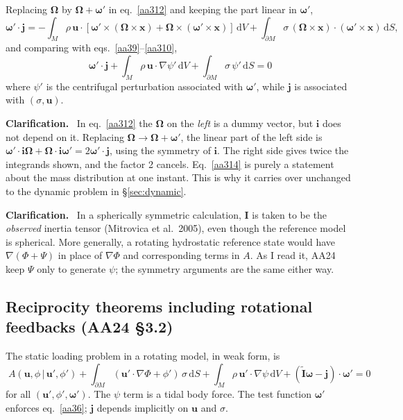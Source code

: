 \documentclass[11pt,a4paper]{article}
\newcommand{\bO}{\bm{\Omega}}
\newcommand{\bw}{\bm{\omega}}
\newcommand{\bx}{\mathbf{x}}
\newcommand{\bu}{\mathbf{u}}
\newcommand{\bj}{\mathbf{j}}
\newcommand{\bI}{\mathbf{I}}
\newcommand{\bi}{\mathbf{i}}
\newcommand{\It}{\tilde{\mathbf{I}}}
\newcommand{\dd}{\,\mathrm{d}}
\newcommand{\pM}{\partial M}
\renewenvironment{leftbar}{%
  \def\FrameCommand{{\color{clarbar}\vrule width 2.5pt}\hspace{8pt}}%
  \MakeFramed{\advance\hsize-\width\FrameRestore}}%
  {\endMakeFramed}
\newenvironment{clar}{\begin{leftbar}\small\noindent\textbf{Clarification.}\ }{\end{leftbar}}
\begin{document}
Replacing $\bO$ by $\bO+\bw'$ in eq.~\eqref{aa312} and keeping the part linear in $\bw'$,
\begin{equation}
  \bw'\cdot\bj=-\int_M\rho\,\bu\cdot[\bw'\times(\bO\times\bx)+\bO\times(\bw'\times\bx)]\dd V
  +\int_{\pM}\sigma\,(\bO\times\bx)\cdot(\bw'\times\bx)\dd S,
  \tag{3.13}\label{aa313}
\end{equation}
and comparing with eqs.~\eqref{aa39}--\eqref{aa310},
\begin{equation}
  \boxed{\;\bw'\cdot\bj+\int_M\rho\,\bu\cdot\nabla\psi'\dd V+\int_{\pM}\sigma\,\psi'\dd S=0\;}
  \tag{3.14}\label{aa314}
\end{equation}
where $\psi'$ is the centrifugal perturbation associated with $\bw'$, while $\bj$ is associated
with $(\sigma,\bu)$.

\begin{clar}
In eq.~\eqref{aa312} the $\bO$ on the \emph{left} is a dummy vector, but $\bi$ does not depend on
it. Replacing $\bO\to\bO+\bw'$, the linear part of the left side is
$\bw'\cdot\bi\bO+\bO\cdot\bi\bw'=2\bw'\cdot\bj$, using the symmetry of $\bi$. The right side gives
twice the integrands shown, and the factor 2 cancels. Eq.~\eqref{aa314} is purely a statement about
the mass distribution at one instant. This is why it carries over unchanged to the dynamic problem
in \S\ref{sec:dynamic}.
\end{clar}

\begin{clar}
In a spherically symmetric calculation, $\bI$ is taken to be the \emph{observed} inertia tensor
(Mitrovica et al.\ 2005), even though the reference model is spherical. More generally, a rotating
hydrostatic reference state would have $\nabla(\Phi+\Psi)$ in place of $\nabla\Phi$ and
corresponding terms in $A$. As I read it, AA24 keep $\Psi$ only to generate $\psi$; the symmetry
arguments are the same either way.
\end{clar}

\subsection{Reciprocity theorems including rotational feedbacks (AA24 \S3.2)}
\label{sec:aa32}

The static loading problem in a rotating model, in weak form, is
\begin{equation}
  \boxed{\;A(\bu,\phi\,|\,\bu',\phi')+\int_{\pM}(\bu'\cdot\nabla\Phi+\phi')\,\sigma\dd S
  +\int_M\rho\,\bu'\cdot\nabla\psi\dd V+(\It\bw-\bj)\cdot\bw'=0\;}
  \tag{3.15}\label{aa315}
\end{equation}
for all $(\bu',\phi',\bw')$. The $\psi$ term is a tidal body force. The test function $\bw'$
enforces eq.~\eqref{aa36}; $\bj$ depends implicitly on $\bu$ and $\sigma$.
\end{document}
